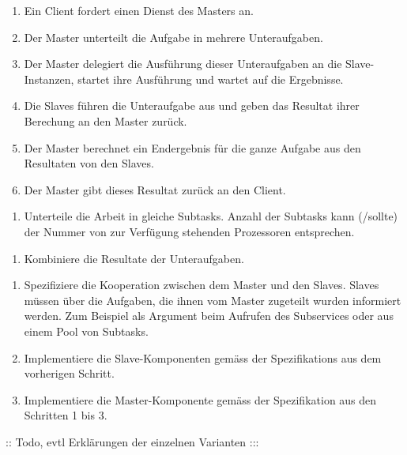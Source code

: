 \begin{enumerate}
	\item Ein Client fordert einen Dienst des Masters an.
	\item Der Master unterteilt die Aufgabe in mehrere Unteraufgaben.
	\item Der Master delegiert die Ausführung dieser Unteraufgaben an die Slave-Instanzen, startet ihre Ausführung und wartet auf die Ergebnisse.
	\item Die Slaves führen die Unteraufgabe aus und geben das Resultat ihrer Berechung an den Master zurück.
	\item Der Master berechnet ein Endergebnis für die ganze Aufgabe aus den Resultaten von den Slaves.
	\item Der Master gibt dieses Resultat zurück an den Client.
\end{enumerate}


\begin{enumerate}
	\item Unterteile die Arbeit in gleiche Subtasks. Anzahl der Subtasks kann (/sollte) der Nummer von zur Verfügung stehenden Prozessoren entsprechen.
\end{enumerate}

\begin{enumerate}
	\item Kombiniere die Resultate der Unteraufgaben.
\end{enumerate}

\begin{enumerate}
	\item Spezifiziere die Kooperation zwischen dem Master und den Slaves. Slaves müssen über die Aufgaben, die ihnen vom Master zugeteilt wurden informiert werden. Zum Beispiel als Argument beim Aufrufen des Subservices oder aus einem Pool von Subtasks.
	\item Implementiere die Slave-Komponenten gemäss der Spezifikations aus dem vorherigen Schritt.
	\item Implementiere die Master-Komponente gemäss der Spezifikation aus den Schritten 1 bis 3.
\end{enumerate}


:: Todo, evtl Erklärungen der einzelnen Varianten :::

